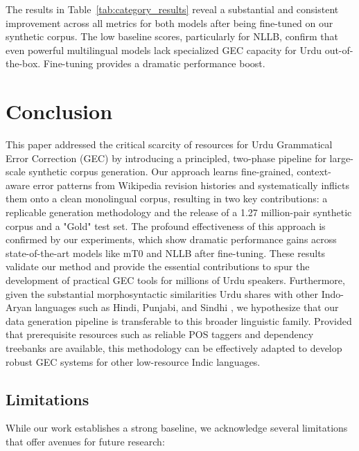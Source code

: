 \documentclass[11pt]{article}
\begin{document}
The results in Table~\ref {tab:category_results} reveal a substantial and consistent improvement across all metrics for both models after being fine-tuned on our synthetic corpus. The low baseline scores, particularly for NLLB, confirm that even powerful multilingual models lack specialized GEC capacity for Urdu out-of-the-box. Fine-tuning provides a dramatic performance boost.
\section{Conclusion}
\label{sec:conclusion}

This paper addressed the critical scarcity of resources for Urdu Grammatical Error Correction (GEC) by introducing a principled, two-phase pipeline for large-scale synthetic corpus generation. Our approach learns fine-grained, context-aware error patterns from Wikipedia revision histories and systematically inflicts them onto a clean monolingual corpus, resulting in two key contributions: a replicable generation methodology and the release of a 1.27 million-pair synthetic corpus and a "Gold" test set. The profound effectiveness of this approach is confirmed by our experiments, which show dramatic performance gains across state-of-the-art models like mT0 and NLLB after fine-tuning. These results validate our method and provide the essential contributions to spur the development of practical GEC tools for millions of Urdu speakers.
Furthermore, given the substantial morphosyntactic similarities Urdu shares with other Indo-Aryan languages such as Hindi, Punjabi, and Sindhi \citep{ButtAhmed2011, Mangrio2021MorphoPhonological}, we hypothesize that our data generation pipeline is transferable to this broader linguistic family. Provided that prerequisite resources such as reliable POS taggers and dependency treebanks are available, this methodology can be effectively adapted to develop robust GEC systems for other low-resource Indic languages.

\subsection{Limitations}
\label{sec:limitations}

While our work establishes a strong baseline, we acknowledge several limitations that offer avenues for future research:
\end{document}
